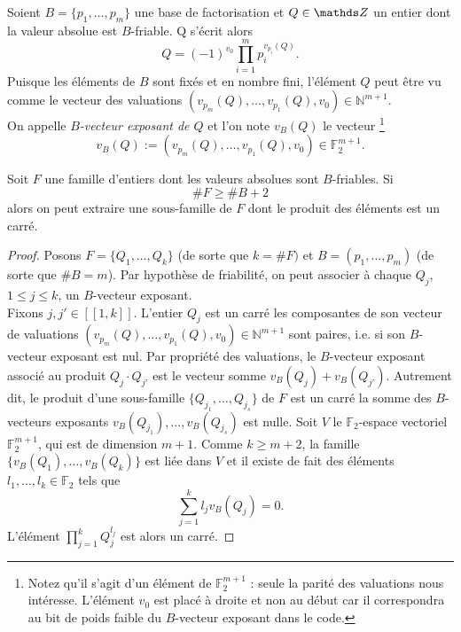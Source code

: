 \begin{definition}
	Soient $B = \{p_1,\dots, p_m \}$ une base de factorisation et $Q\in \Z$ un
	entier dont la valeur absolue est $B$-friable. Q s'écrit alors 
    \[Q = (-1)^{v_0}\prod_{i=1}^m p_i^{v_{p_i}(Q)}.\] 
    Puisque les éléments de $B$ sont fixés et en nombre fini, l'élément
	$Q$ peut être vu comme le vecteur des valuations $(v_{p_m}(Q), \dots,
    v_{p_1}(Q), v_0 ) \in \mathbb{N}^{m+1}$. \\

    On appelle \emph{$B$-vecteur
	exposant de $Q$} et l'on note $v_B(Q)$ le vecteur
    \footnote{Notez qu'il 
    s'agit d'un élément de $\mathbb{F}_2^{m+1}$ : seule la parité des
    valuations nous intéresse. L'élément $v_0$ est placé à droite et non au 
    début car il correspondra au bit de poids faible du $B$-vecteur exposant
    dans le code.} 
     \[v_B(Q) :=
	(v_{p_m}(Q), \dots, v_{p_1}(Q), v_0 ) \in \mathbb{F}_2^{m+1}.\] 
\end{definition}

\begin{proposition}
	Soit $F$ une famille d'entiers dont les valeurs absolues sont $B$-friables.
	Si \[\# F \geqslant \# B + 2\] alors on peut extraire une sous-famille de
	$F$ dont le produit des éléments est un carré.
\end{proposition}

\begin{proof}
	Posons $F = \{Q_1, \dots, Q_k\}$ (de sorte que $k = \# F)$ et $B = (p_1,
	\dots, p_m)$ (de sorte que $\# B = m$). Par hypothèse de friabilité,
    on peut associer à chaque $Q_j$, $1\leqslant j \leqslant k$, un 
    $B$-vecteur exposant.\\

    Fixons $j, j'\in [\![1,k]\!]$. L'entier $Q_j$ est un carré \ssi les 
    composantes de son vecteur de valuations $(v_{p_m}(Q), \dots,
    v_{p_1}(Q), v_0 ) \in \mathbb{N}^{m+1}$ sont paires, i.e. si son 
    $B$-vecteur exposant est nul. Par propriété des valuations, le
    $B$-vecteur exposant associé au produit $Q_j\cdot Q_{j'}$ est le vecteur
    somme $v_B(Q_j) + v_B(Q_{j'})$. Autrement dit, le produit d'une sous-famille
    $\{Q_{j_1}, \dots, Q_{j_s}\}$ de $F$ est un carré \ssi la somme des 
    $B$-vecteurs exposants $v_B(Q_{j_1}), \dots, v_B(Q_{j_s})$ est nulle. Soit
    $V$ le $\mathbb{F}_2$-espace vectoriel $\mathbb{F}_2^{m+1}$, qui est de 
    dimension $m+1$. Comme $k\geqslant m+2$, la famille $\{v_B(Q_1), \dots,
    v_B(Q_k)\}$ est liée dans $V$ et il existe de fait des éléments $l_1,\dots,
    l_k\in \mathbb{F}_2$ tels que \[\sum_{j=1}^k l_j v_B(Q_j) = 0.\] L'élément
    $\prod_{j=1}^k Q_j^{l_j}$ est alors un carré.
\end{proof}

